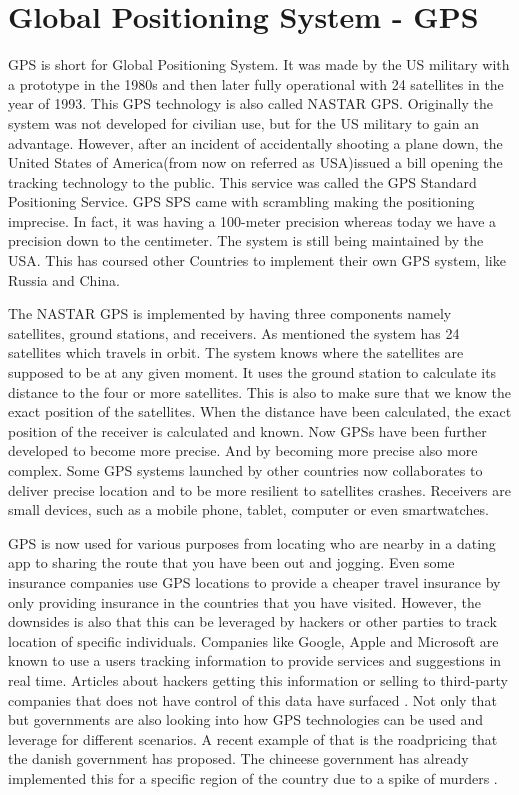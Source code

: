 \section{Global Positioning System - GPS}
GPS is short for Global Positioning System. It was made by the US military with a prototype in the 1980s and then later fully operational with 24 satellites in the year of 1993. This GPS technology is also called NASTAR GPS. Originally the system was not developed for civilian use, but for the US military to gain an advantage. However, after an incident of accidentally shooting a plane down, the United States of America(from now on referred as USA)issued a bill opening the tracking technology to the public. This service was called the GPS Standard Positioning Service. GPS SPS came with scrambling making the positioning imprecise. In fact, it was having a 100-meter precision whereas today we have a precision down to the centimeter. The system is still being maintained by the USA. This has coursed other Countries to implement their own GPS system, like Russia and China.

The NASTAR GPS is implemented by having three components namely satellites, ground stations, and receivers. As mentioned the system has 24 satellites which travels in orbit. The system knows where the satellites are supposed to be at any given moment. It uses the ground station to calculate its distance to the four or more satellites. This is also to make sure that we know the exact position of the satellites. When the distance have been calculated, the exact position of the receiver is calculated and known. Now GPSs have been further developed to become more precise. And by becoming more precise also more complex. Some GPS systems launched by other countries now collaborates to deliver precise location and to be more resilient to satellites crashes.
Receivers are small devices, such as a mobile phone, tablet, computer or even smartwatches. 

GPS is now used for various purposes from locating who are nearby in a dating app to sharing the route that you have been out and jogging. Even some insurance companies use GPS locations to provide a cheaper travel insurance by only providing insurance in the countries that you have visited. However, the downsides is also that this can be leveraged by hackers or other parties to track location of specific individuals. Companies like Google, Apple and Microsoft are known to use a users tracking information to provide services and suggestions in real time. Articles about hackers getting this information or selling to third-party companies that does not have control of this data  have surfaced . Not only that but governments are also looking into how GPS technologies can be used and leverage for different scenarios. A recent example of that is the roadpricing that the danish government has proposed. The chineese government has already implemented this for a specific region of the country due to a spike of murders \cite{guardian:2017}.

